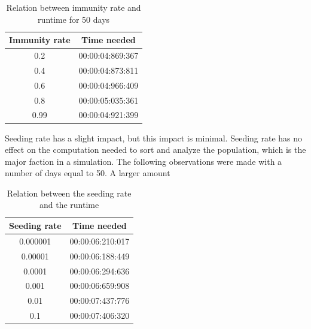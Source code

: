 \documentclass[runningheads]{llncs}
\begin{document}
	\begin{table}
		\caption{Relation between immunity rate and runtime for 50 days}
		\begin{center}
			\begin{tabular}{ | c | c |}
				\hline
				Immunity rate & Time needed \\ \hline
				0.2 & 00:00:04:869:367 \\ \hline
				0.4 & 00:00:04:873:811 \\ \hline
				0.6 & 00:00:04:966:409 \\ \hline
				0.8 & 00:00:05:035:361 \\ \hline
				0.99 & 00:00:04:921:399 \\
				\hline	
			\end{tabular}
		\end{center}
	\end{table}
	
	\noindent
	Seeding rate has a slight impact, but this impact is minimal. Seeding rate has no effect on the computation needed to sort and analyze the population, which is the major faction in a simulation. The following observations were made with a number of days equal to 50. A larger amount 
	\begin{table}
		\caption{Relation between the seeding rate and the runtime}
		\begin{center}
			\begin{tabular}{ | c | c |}
				\hline
				Seeding rate & Time needed \\ \hline
				0.000001 & 00:00:06:210:017 \\ \hline
				0.00001 & 00:00:06:188:449 \\ \hline
				0.0001 & 00:00:06:294:636 \\ \hline
				0.001 & 00:00:06:659:908 \\ \hline
				0.01 & 00:00:07:437:776 \\ \hline
				0.1 & 00:00:07:406:320 \\
				\hline	
			\end{tabular}
		\end{center} 
	\end{table} 
	\noindent
	
\end{document}
